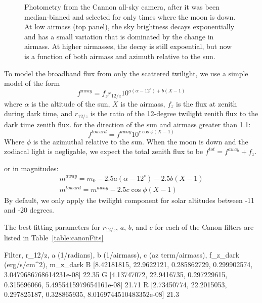 \documentclass{emulateapj}  %
\begin{document}
\begin{figure*}
  \caption{Photometry from the Cannon all-sky camera, after it was been median-binned and selected for only times where the moon is down.  At low airmass (top panel), the sky brightness decays exponentially and has a small variation that is dominated by the change in airmass.  At higher airmasses, the decay is still expoential, but now is a function of both airmass and azimuth relative to the sun.}
\end{figure*}

To model the broadband flux from only the scattered twilight, we use a simple model of the form
\begin{equation}
  f^{away} = f_{z} r_{12/z} 10^{a(\alpha-12^{\circ})+b(X-1)}
\end{equation}
where $\alpha$ is the altitude of the sun, $X$ is the airmass, $f_{z}$ is the flux at zenith during dark time, and $r_{12/z}$ is the ratio of the 12-degree twilight zenith flux to the dark time zenith flux.
for the direction of the sun and airmass greater than 1.1:
\begin{equation}
  f^{toward} = f^{away}10^{c \cos{\phi}(X-1)}
\end{equation}
Where $\phi$ is the azimuthal relative to the sun. When the moon is down and the zodiacal light is negligable, we expect the total zenith flux to be $f^{tot} = f^{away} + f_{z}$.  

or in magnitudes:
\begin{eqnarray}
  m^{away} = m_0 -2.5a(\alpha-12^{\circ})-2.5b(X-1) \\
  m^{toward} = m^{away} -2.5c\cos{\phi}(X-1)
\end{eqnarray}
By default, we only apply the twilight component for solar altitudes between -11 and -20 degrees.


The best fitting parameters for $r_{12/z}$, $a$, $b$, and $c$ for each of the Canon filters are listed in Table~\ref{table:canonFits}



Filter, r_{12/z}, a (1/radians), b (1/airmass), c (az term/airmass), f_z_dark (erg/s/cm^2), m_z_dark
B [8.42181815, 22.9622121, 0.285862729, 0.299902574, 3.0479686768614231e-08] 22.35
G [4.13747072, 22.9416735, 0.297229615, 0.315696066, 5.4955415979654161e-08] 21.71
R [2.73450774, 22.2015053, 0.297825187, 0.328865935, 8.0169744510483352e-08] 21.3
\end{document}
